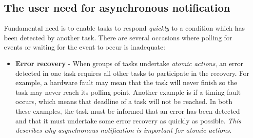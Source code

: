 \subsection{The user need for asynchronous notification}
Fundamental need is to enable tasks to respond \textit{quickly} to a condition which has been detected by another task. There are several occasions where polling for events or waiting for the event to occur is inadequate:
\begin{itemize}
\item \textbf{Error recovery} - When groups of tasks undertake \textit{atomic actions}, an error detected in one task requires all other tasks to participate in the recovery. For example, a hardware fault may mean that the task will never finish so the task may never reach its polling point. Another example is if a timing fault occurs, which means that deadline of a task will not be reached. In both these examples, the task must be informed that an error has been detected and that it must undertake some error recovery as quickly as possible. \textit{This describes why asynchronous notification is important for atomic actions}. 
\end{itemize}

